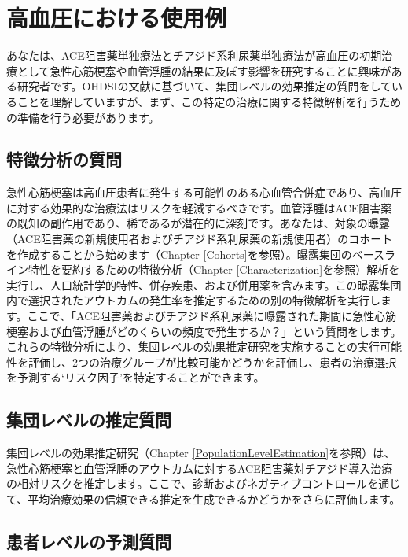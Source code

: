 \documentclass[
  11pt]{book}
\theoremstyle{definition}
\theoremstyle{definition}
\theoremstyle{definition}
\theoremstyle{definition}
\theoremstyle{remark}
\begin{document}
\section{高血圧における使用例}\label{ux9ad8ux8840ux5727ux306bux304aux3051ux308bux4f7fux7528ux4f8b}

あなたは、ACE阻害薬単独療法とチアジド系利尿薬単独療法が高血圧の初期治療として急性心筋梗塞や血管浮腫の結果に及ぼす影響を研究することに興味がある研究者です。OHDSIの文献に基づいて、集団レベルの効果推定の質問をしていることを理解していますが、まず、この特定の治療に関する特徴解析を行うための準備を行う必要があります。

\subsection{特徴分析の質問}\label{ux7279ux5fb4ux5206ux6790ux306eux8ceaux554f}

急性心筋梗塞は高血圧患者に発生する可能性のある心血管合併症であり、高血圧に対する効果的な治療法はリスクを軽減するべきです。血管浮腫はACE阻害薬の既知の副作用であり、稀であるが潜在的に深刻です。あなたは、対象の曝露（ACE阻害薬の新規使用者およびチアジド系利尿薬の新規使用者）のコホートを作成することから始めます（Chapter \ref{Cohorts}を参照）。曝露集団のベースライン特性を要約するための特徴分析（Chapter \ref{Characterization}を参照）解析を実行し、人口統計学的特性、併存疾患、および併用薬を含みます。この曝露集団内で選択されたアウトカムの発生率を推定するための別の特徴解析を実行します。ここで、「ACE阻害薬およびチアジド系利尿薬に曝露された期間に急性心筋梗塞および血管浮腫がどのくらいの頻度で発生するか？」という質問をします。これらの特徴分析により、集団レベルの効果推定研究を実施することの実行可能性を評価し、2つの治療グループが比較可能かどうかを評価し、患者の治療選択を予測する`リスク因子'を特定することができます。

\subsection{集団レベルの推定質問}\label{ux96c6ux56e3ux30ecux30d9ux30ebux306eux63a8ux5b9aux8ceaux554f}

集団レベルの効果推定研究（Chapter \ref{PopulationLevelEstimation}を参照）は、急性心筋梗塞と血管浮腫のアウトカムに対するACE阻害薬対チアジド導入治療の相対リスクを推定します。ここで、診断およびネガティブコントロールを通じて、平均治療効果の信頼できる推定を生成できるかどうかをさらに評価します。

\subsection{患者レベルの予測質問}\label{ux60a3ux8005ux30ecux30d9ux30ebux306eux4e88ux6e2cux8ceaux554f}
\end{document}
